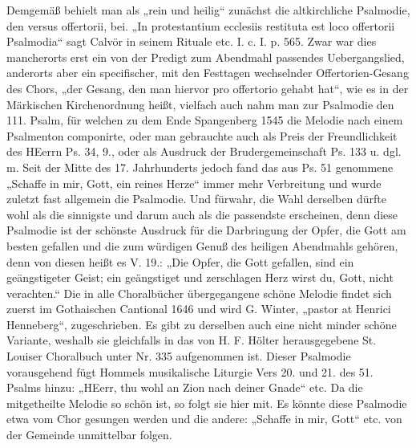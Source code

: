 Demgemäß behielt man als „rein und heilig“ zunächst die altkirchliche Psalmodie, den versus offertorii, bei. „In protestantium ecclesiis restituta est loco offertorii Psalmodia“ sagt Calvör in seinem Rituale etc. I. c. I. p. 565. Zwar war dies mancherorts erst ein von der Predigt zum Abendmahl passendes Uebergangslied, anderorts aber ein specifischer, mit den Festtagen wechselnder Offertorien-Gesang des Chors, „der Gesang, den man hiervor pro offertorio gehabt hat“, wie es in der Märkischen Kirchenordnung heißt, vielfach auch nahm man zur Psalmodie den 111. Psalm, für welchen zu dem Ende Spangenberg 1545 die Melodie nach einem Psalmenton componirte, oder man gebrauchte auch als Preis der Freundlichkeit des HEerrn Ps. 34, 9., oder als Ausdruck der Brudergemeinschaft Ps. 133 u. dgl. m. Seit der Mitte des 17. Jahrhunderts jedoch fand das aus Ps. 51 genommene „Schaffe in mir, Gott, ein
reines Herze“ immer mehr Verbreitung und wurde zuletzt fast allgemein die Psalmodie. Und fürwahr, die Wahl derselben dürfte wohl als die sinnigste und darum auch als die passendste erscheinen, denn diese Psalmodie ist der schönste Ausdruck für die Darbringung der Opfer, die Gott am besten gefallen und die zum würdigen Genuß des heiligen Abendmahls gehören, denn von diesen heißt es V. 19.: „Die Opfer, die Gott gefallen, sind ein geängstigeter Geist; ein geängstiget und zerschlagen Herz wirst du, Gott, nicht verachten.“ Die in alle Choralbücher übergegangene schöne Melodie findet sich zuerst im Gothaischen Cantional 1646 und wird G. Winter, „pastor at Henrici Henneberg“, zugeschrieben. Es gibt zu derselben auch eine nicht minder schöne Variante, weshalb sie gleichfalls in das von H. F. Hölter herausgegebene St. Louiser Choralbuch unter Nr. 335 aufgenommen ist. Dieser Psalmodie vorausgehend fügt Hommels musikalische Liturgie Vers 20. und 21. des 51. Psalms hinzu: „HEerr, thu wohl an Zion nach deiner Gnade“ etc. Da die mitgetheilte Melodie so schön ist, so folgt sie hier mit. Es könnte diese Psalmodie etwa vom Chor gesungen werden und die andere: „Schaffe in mir, Gott“ etc. von der Gemeinde unmittelbar folgen.


